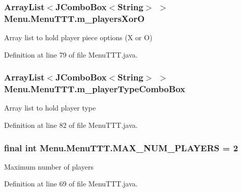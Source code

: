 \subsubsection[{m\+\_\+players\+Xor\+O}]{\setlength{\rightskip}{0pt plus 5cm}Array\+List$<$J\+Combo\+Box$<$String$>$ $>$ Menu.\+Menu\+T\+T\+T.\+m\+\_\+players\+Xor\+O\hspace{0.3cm}{\ttfamily [private]}}\label{class_menu_1_1_menu_t_t_t_a1f431306714855f214aacab632031a23}
Array list to hold player piece options (X or O) 

Definition at line 79 of file Menu\+T\+T\+T.\+java.

\hypertarget{class_menu_1_1_menu_t_t_t_a0d29323e5abc375ee10f1b27ecd6e1bd}{}
\subsubsection[{m\+\_\+player\+Type\+Combo\+Box}]{\setlength{\rightskip}{0pt plus 5cm}Array\+List$<$J\+Combo\+Box$<$String$>$ $>$ Menu.\+Menu\+T\+T\+T.\+m\+\_\+player\+Type\+Combo\+Box\hspace{0.3cm}{\ttfamily [private]}}\label{class_menu_1_1_menu_t_t_t_a0d29323e5abc375ee10f1b27ecd6e1bd}
Array list to hold player type 

Definition at line 82 of file Menu\+T\+T\+T.\+java.

\hypertarget{class_menu_1_1_menu_t_t_t_a634a62eb8c913decb22f2b27ad64e2b6}{}
\subsubsection[{M\+A\+X\+\_\+\+N\+U\+M\+\_\+\+P\+L\+A\+Y\+E\+R\+S}]{\setlength{\rightskip}{0pt plus 5cm}final int Menu.\+Menu\+T\+T\+T.\+M\+A\+X\+\_\+\+N\+U\+M\+\_\+\+P\+L\+A\+Y\+E\+R\+S = 2\hspace{0.3cm}{\ttfamily [private]}}\label{class_menu_1_1_menu_t_t_t_a634a62eb8c913decb22f2b27ad64e2b6}
Maximum number of players 

Definition at line 69 of file Menu\+T\+T\+T.\+java.



